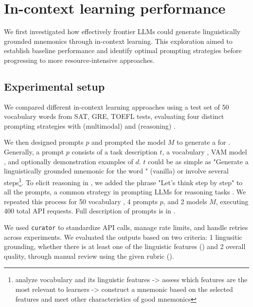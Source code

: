 \section{In-context learning performance} \label{sec:icl-performance}

We first investigated how effectively frontier LLMs could generate linguistically grounded mnemonics through in-context learning. This exploration aimed to establish baseline performance and identify optimal prompting strategies before progressing to more resource-intensive approaches.

\subsection{Experimental setup}

We compared different in-context learning approaches using a test set of 50 vocabulary words from SAT, GRE, TOEFL tests, evaluating four distinct prompting strategies with \xteachermodel (multimodal) and \teachermodel (reasoning) \citep{DeepSeek-AIDEEPSEEKR12025,DeepSeekV32025}.

We then designed prompts $p$ and prompted the model $M$ to generate a \lgm \mnem for \vocab. Generally, a prompt $p$ consists of a task description $t$, a vocabulary \vocab, VAM model , and optionally demonstration examples of \lgms $d$. $t$ could be as simple as "Generate a linguistically grounded mnemonic for the word \vocab" (vanilla) or involve several steps\footnote{analyze vocabulary and its linguistic features -> assess which features are the most relevant to learners -> construct a mnemonic based on the selected features and meet other characteristics of good mnemonics}. To elicit reasoning in \xteachermodel, we added the phrase "Let's think step by step" to all the prompts, a common strategy in prompting LLMs for reasoning tasks \citep{weiChainofThoughtPromptingElicits2022}. We repeated this process for 50 vocabulary \vocab, 4 prompts $p$, and 2 models $M$, executing 400 total API requests. Full description of prompts is in .

We used \verb|curator| \citep{BespokeLabBESPOKE2025} to standardize API calls, manage rate limits, and handle retries across experiments. We evaluated the outputs based on two criteria: \numlist{1} lingusitic grounding, whether there is at least one of the linguistic features () and \numlist{2} overall quality, through manual review using the given rubric ().

